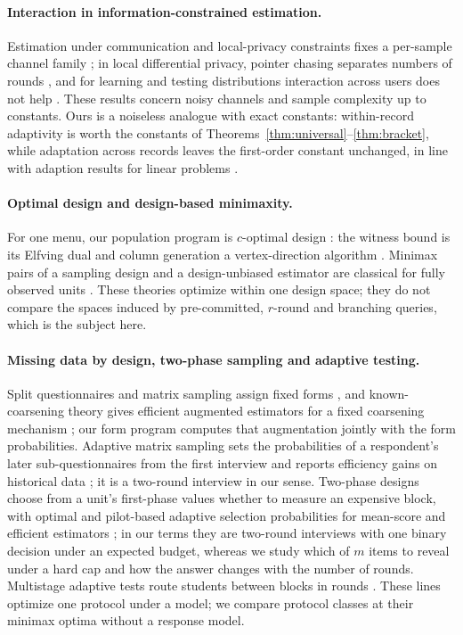 \documentclass{article}
\begin{document}
\paragraph{Interaction in information-constrained estimation.} Estimation under communication and local-privacy constraints fixes a per-sample channel family \citep{acharya2019,barnes2020}; in local differential privacy, pointer chasing separates numbers of rounds \citep{joseph2019,joseph2020}, and for learning and testing distributions interaction across users does not help \citep{acharya2022tit,lau2026}. These results concern noisy channels and sample complexity up to constants. Ours is a noiseless analogue with exact constants: within-record adaptivity is worth the constants of Theorems~\ref{thm:universal}--\ref{thm:bracket}, while adaptation across records leaves the first-order constant unchanged, in line with adaption results for linear problems \citep{bakhvalov1971,novak1996}.

\paragraph{Optimal design and design-based minimaxity.} For one menu, our population program is $c$-optimal design \citep{elfving1952,pukelsheim1993}: the witness bound is its Elfving dual and column generation a vertex-direction algorithm \citep{fedorov1972,wynn1970,sagnol2011}. Minimax pairs of a sampling design and a design-unbiased estimator are classical for fully observed units \citep{stenger1979,gabler1990,aronow2026}. These theories optimize within one design space; they do not compare the spaces induced by pre-committed, $r$-round and branching queries, which is the subject here.

\paragraph{Missing data by design, two-phase sampling and adaptive testing.} Split questionnaires and matrix sampling assign fixed forms \citep{raghunathan1995,graham2006,thomas2006,chipperfield2009,rhemtulla2012}, and known-coarsening theory gives efficient augmented estimators for a fixed coarsening mechanism \citep{robins1994,tsiatis2006}; our form program computes that augmentation jointly with the form probabilities. Adaptive matrix sampling sets the probabilities of a respondent's later sub-questionnaires from the first interview and reports efficiency gains on historical data \citep{gonzalez2008}; it is a two-round interview in our sense. Two-phase designs choose from a unit's first-phase values whether to measure an expensive block, with optimal and pilot-based adaptive selection probabilities for mean-score and efficient estimators \citep{reilly1995,gilbert2014,mcisaac2015,tao2020,chen2020,chen2022}; in our terms they are two-round interviews with one binary decision under an expected budget, whereas we study which of $m$ items to reveal under a hard cap and how the answer changes with the number of rounds. Multistage adaptive tests route students between blocks in rounds \citep{yamamoto2018,fink2024}. These lines optimize one protocol under a model; we compare protocol classes at their minimax optima without a response model.
\end{document}
